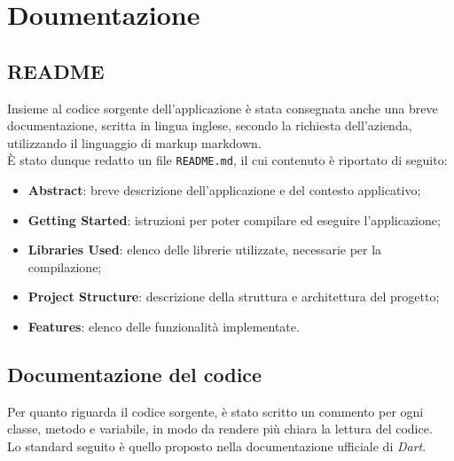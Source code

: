 

\section{Doumentazione}
\label{sec:documentation}

\subsection*{README}
\label{sec:readme}

Insieme al codice sorgente dell'applicazione è stata consegnata anche una breve documentazione, scritta in lingua inglese, secondo la richiesta dell'azienda, utilizzando il linguaggio di markup \gls{markdown}\glsoccur.\\
È stato dunque redatto un file \lstinline{README.md}, il cui contenuto è riportato di seguito:
\begin{itemize}
    \item \textbf{Abstract}: breve descrizione dell'applicazione e del contesto applicativo;
    \item \textbf{Getting Started}: istruzioni per poter compilare ed eseguire l'applicazione;
    \item \textbf{Libraries Used}: elenco delle librerie utilizzate, necessarie per la compilazione;
    \item \textbf{Project Structure}: descrizione della struttura e architettura del progetto;
    \item \textbf{Features}: elenco delle funzionalità implementate.
\end{itemize}


\subsection*{Documentazione del codice}
\label{sec:documentazione-codice}

Per quanto riguarda il codice sorgente, è stato scritto un commento per ogni classe, metodo e variabile, in modo da rendere più chiara la lettura del codice.\\
Lo standard seguito è quello proposto nella documentazione ufficiale di \emph{Dart}\cite{site:comment}. \\

